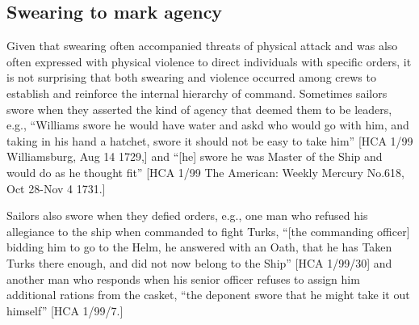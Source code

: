 \subsection{{Swearing} {to} {mark} {agency}}%

  Given that swearing often accompanied threats of physical attack and was also often expressed with physical violence to direct individuals with specific orders, it is not surprising that both swearing and violence occurred among crews to establish and reinforce the internal hierarchy of command. Sometimes sailors swore when they asserted the kind of agency that deemed them to be leaders, e.g., “Williams swore he would have water and askd who would go with him, and taking in his hand a hatchet, swore it should not be easy to take him” [HCA 1/99 Williamsburg, Aug 14 1729,] and “[he] swore he was Master of the Ship and would do as he thought fit” [HCA 1/99 The American: Weekly Mercury No.618, Oct 28-Nov 4 1731.] 

Sailors also swore when they defied orders, e.g., one man who refused his allegiance to the ship when commanded to fight Turks, “[the commanding officer] bidding him to go to the Helm, he answered with an Oath, that he has Taken Turks there enough, and did not now belong to the Ship” [HCA 1/99/30] and another man who responds when his senior officer refuses to assign him additional rations from the casket, “the deponent swore that he might take it out himself” [HCA 1/99/7.] 

